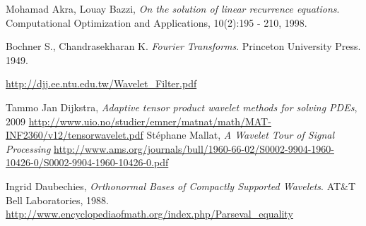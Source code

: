 \documentclass[11pt]{uvamath}
\theoremstyle{plain}
\theoremstyle{definition}
\theoremstyle{remark}
\begin{document}
\begin{thebibliography}{11}

  Mohamad Akra, Louay Bazzi,
  \emph{On the solution of linear recurrence equations}.
  Computational Optimization and Applications,
  10(2):195 - 210,
  1998.

  Bochner S., Chandrasekharan K.
  \emph{Fourier Transforms}.
  Princeton University Press.
  1949.

  \url{http://djj.ee.ntu.edu.tw/Wavelet_Filter.pdf}

  Tammo Jan Dijkstra,
  \emph{Adaptive tensor product wavelet methods for solving PDEs}, 2009
  \url{http://www.uio.no/studier/emner/matnat/math/MAT-INF2360/v12/tensorwavelet.pdf}
  St\'ephane Mallat,
  \emph{A Wavelet Tour of Signal Processing}
  \url{http://www.ams.org/journals/bull/1960-66-02/S0002-9904-1960-10426-0/S0002-9904-1960-10426-0.pdf}

  Ingrid Daubechies, \emph{Orthonormal Bases of Compactly Supported Wavelets}.
  AT\&T Bell Laboratories, 1988.
  \url{http://www.encyclopediaofmath.org/index.php/Parseval_equality}

\end{thebibliography}
\end{document}
